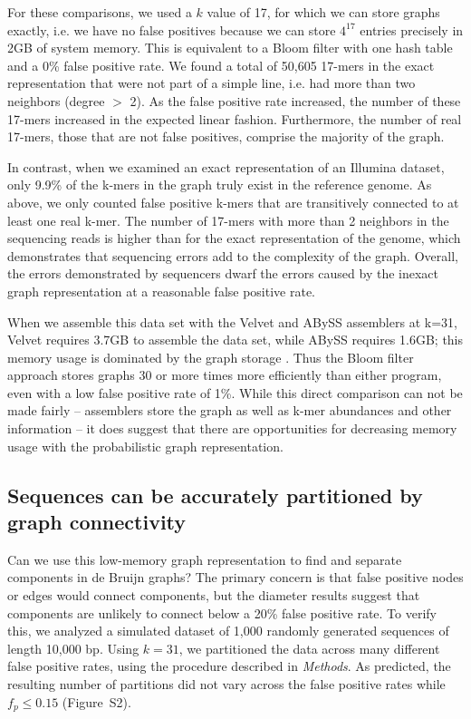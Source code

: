 \documentclass[draft]{pnastwo}
\begin{document}
\begin{article}
For these comparisons, we used a $k$ value of 17, for which we can
store graphs exactly,
i.e. we have no false
positives because we can store $4^{17}$ entries precisely in 2GB of
system memory. This is equivalent to a Bloom filter with one hash
table and a 0\% false positive rate.  We found a total of 50,605
17-mers in the exact representation that were not part of a simple
line, i.e. had more than two neighbors (degree $>$ 2). As the false
positive rate increased, the number of these 17-mers increased in the
expected linear fashion.
Furthermore, the number of real 17-mers, those that are not false
positives, comprise the majority of the graph.

In contrast, when we examined an exact representation of an Illumina
dataset, only 9.9\% of the k-mers in the graph truly exist in the
reference genome.  As above, we only counted false positive k-mers
that are transitively connected to at least one real k-mer. The number of
17-mers with more than 2 neighbors in the sequencing reads is higher than for the exact
representation of the genome, which demonstrates that sequencing
errors add to the complexity of the graph. Overall, the errors
demonstrated by sequencers dwarf the errors caused by the inexact
graph representation at a reasonable false positive rate.

When we assemble this data set with the Velvet and ABySS assemblers at
k=31, Velvet requires 3.7GB to assemble the data set, while ABySS
requires 1.6GB; this memory usage is dominated by the graph storage
\cite{zerbinothesis}. Thus the Bloom filter approach stores graphs 30
or more times more efficiently than either program, even with a low
false positive rate of 1\%.  While this direct comparison can not be
made fairly -- assemblers store the graph as well as k-mer abundances
and other information -- it does suggest that there are opportunities
for decreasing memory usage with the probabilistic graph representation.

\subsection{Sequences can be accurately partitioned by graph connectivity}


Can we use this low-memory graph representation to find and separate
components in de Bruijn graphs?  The primary concern is that false
positive nodes or edges would connect components, but the diameter
results suggest that components are unlikely to connect below a 20\%
false positive rate.  To verify this, we analyzed a simulated dataset
of 1,000 randomly generated sequences of length 10,000 bp.  Using
$k=31$, we partitioned the data across many different false positive
rates, using the procedure described in \emph{Methods}. As predicted,
the resulting number of partitions did not vary across the false
positive rates while $f_p \le 0.15$ (Figure~S2).


\end{article}
\end{document}
